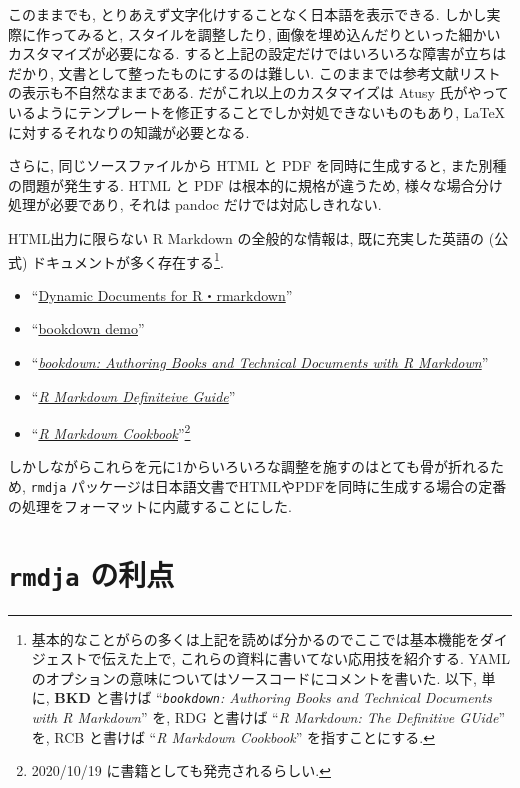 \documentclass[
  xelatex,ja=standard,jafont=noto]{bxjsbook}
\providecommand{\tightlist}{%
  \setlength{\itemsep}{0pt}\setlength{\parskip}{0pt}}
\theoremstyle{definition}
\theoremstyle{definition}
\theoremstyle{definition}
\theoremstyle{definition}
\theoremstyle{remark}
\begin{document}
このままでも, とりあえず文字化けすることなく日本語を表示できる.
しかし実際に作ってみると, スタイルを調整したり,
画像を埋め込んだりといった細かいカスタマイズが必要になる.
すると上記の設定だけではいろいろな障害が立ちはだかり,
文書として整ったものにするのは難しい.
このままでは参考文献リストの表示も不自然なままである.
だがこれ以上のカスタマイズは Atusy
氏がやっているようにテンプレートを修正することでしか対処できないものもあり,
\LaTeX に対するそれなりの知識が必要となる.

さらに, 同じソースファイルから HTML と PDF を同時に生成すると,
また別種の問題が発生する. HTML と PDF は根本的に規格が違うため,
様々な場合分け処理が必要であり, それは pandoc だけでは対応しきれない.

HTML出力に限らない R Markdown の全般的な情報は, 既に充実した英語の
(公式) ドキュメントが多く存在する\footnote{基本的なことがらの多くは上記を読めば分かるのでここでは基本機能をダイジェストで伝えた上で,
  これらの資料に書いてない応用技を紹介する. YAML
  のオプションの意味についてはソースコードにコメントを書いた. 以下,
  単に, \textbf{BKD} と書けば ``\emph{\texttt{bookdown}: Authoring Books
  and Technical Documents with R Markdown}'' \citep{R-bookdown} を, RDG
  と書けば ``\emph{R Markdown: The Definitive GUide}''
  \citep{rmarkdown2018} を, RCB と書けば ``\emph{R Markdown Cookbook}''
  \citep{xie2020Markdown} を指すことにする.}.

\begin{itemize}
\tightlist
\item
  ``\href{https://rmarkdown.rstudio.com/docs/index.html}{Dynamic
  Documents for R・rmarkdown}''
\item
  ``\href{https://github.com/rstudio/bookdown-demo}{bookdown demo}''
\item
  ``\href{https://bookdown.org/yihui/bookdown/}{\emph{bookdown:
  Authoring Books and Technical Documents with R Markdown}}''
\item
  ``\href{https://bookdown.org/yihui/rmarkdown/}{\emph{R Markdown
  Definiteive Guide}}''
\item
  ``\href{https://bookdown.org/yihui/rmarkdown-cookbook}{\emph{R
  Markdown Cookbook}}''\footnote{2020/10/19
    に書籍としても発売されるらしい.}
\end{itemize}

しかしながらこれらを元に1からいろいろな調整を施すのはとても骨が折れるため,
\texttt{rmdja}
パッケージは日本語文書でHTMLやPDFを同時に生成する場合の定番の処理をフォーマットに内蔵することにした.

\hypertarget{rmdja-ux306eux5229ux70b9}{%
\section*{\texorpdfstring{\texttt{rmdja}
の利点}{rmdja の利点}}\label{rmdja-ux306eux5229ux70b9}}
\end{document}
